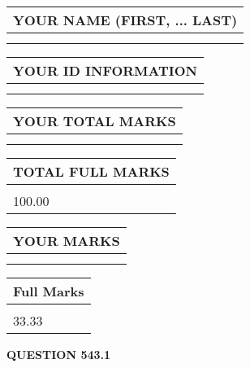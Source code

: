 \documentclass{ctexart}
\begin{document}
   
   
   
\newpage 
\setcounter{page}{ 
   543001 } 
   
   
   
   
\noindent\begin{tabular}{|l|}
\hline
YOUR NAME (FIRST, ... LAST)  \\
\hline
 \\ 
 \\ 
\hline
\end{tabular}
\hspace{0.05in} \begin{tabular}{|l|}
\hline
 YOUR   ID   INFORMATION  \\
\hline
 \\ 
 \\ 
\hline
\end{tabular}
   
   
\vspace{0.2in}\noindent\begin{tabular}{|l|}
\hline
YOUR TOTAL MARKS  \\
\hline
 \\ 
 \\ 
\hline
\end{tabular}
\hspace{0.05in} \begin{tabular}{|l|}
\hline
TOTAL FULL MARKS  \\
\hline
 \\ 
100.00 \\
\hline
\end{tabular}
   
   
 \vspace{0.2in}
 
 
 
 
   
   
  
\vspace{0.2in}
  
\noindent\begin{tabular}{|l|}
\hline
 YOUR MARKS  \\
\hline
 \\ 
 \\ 
\hline
\end{tabular}
\hspace{0.05in} \begin{tabular}{|l|}
\hline
 Full Marks  \\
\hline
 \\ 
33.33 \\
\hline
\end{tabular}
{\textbf{\Large{QUESTION
543.1 
}}}
  
\end{document}
